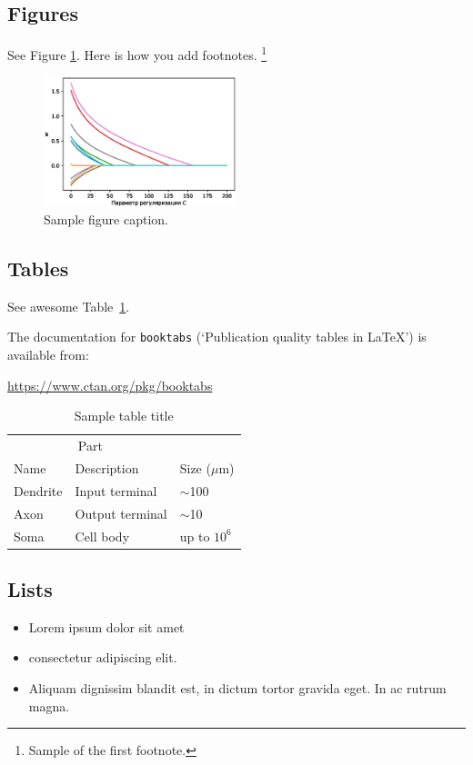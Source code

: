 \documentclass{article}
\begin{document}
\subsection{Figures}
\lipsum[10]
See Figure \ref{fig:fig1}. Here is how you add footnotes. \footnote{Sample of the first footnote.}
\lipsum[11]

\begin{figure}
	\centering
	\includegraphics[width=0.5\textwidth]{../figures/log_reg_cs_exp.eps}
	\caption{Sample figure caption.}
	\label{fig:fig1}
\end{figure}

\subsection{Tables}
See awesome Table~\ref{tab:table}.

The documentation for \verb+booktabs+ (`Publication quality tables in LaTeX') is available from:
\begin{center}
	\url{https://www.ctan.org/pkg/booktabs}
\end{center}


\begin{table}
	\caption{Sample table title}
	\centering
	\begin{tabular}{lll}
		\toprule
		\multicolumn{2}{c}{Part}                   \\
		\cmidrule(r){1-2}
		Name     & Description     & Size ($\mu$m) \\
		\midrule
		Dendrite & Input terminal  & $\sim$100     \\
		Axon     & Output terminal & $\sim$10      \\
		Soma     & Cell body       & up to $10^6$  \\
		\bottomrule
	\end{tabular}
	\label{tab:table}
\end{table}

\subsection{Lists}
\begin{itemize}
	\item Lorem ipsum dolor sit amet
	\item consectetur adipiscing elit.
	\item Aliquam dignissim blandit est, in dictum tortor gravida eget. In ac rutrum magna.
\end{itemize}




\end{document}
